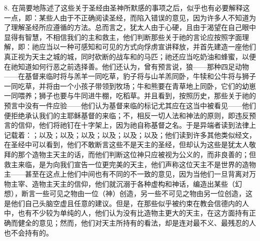 8. 在简要地陈述了这些关于圣经由圣神所默感的事项之后，似乎也有必要解释这一点，即：某些人由于不正确阅读圣经，而陷入错误的意见，因为许多人不知道为了理解圣经所应遵循的方法。总而言之，犹太人由于心硬，且由于渴望在自己眼中显得有智慧，不相信我们的主和救主，他们判断那些关于祂的言论应按照字面理解，即：祂应当以一种可感知和可见的方式向俘虏宣讲释放，并首先建造一座他们真正视为天主之城的城，同时砍断的战车和的马匹；祂还应当吃奶油和蜂蜜，以便在祂知道如何行恶之前选择善。他们还认为，曾有预言说，狼——那种四足动物——在基督来临时将与羔羊一同吃草，豹子将与山羊羔同卧，牛犊和公牛将与狮子一同吃草，并将由一个小孩子带领到牧场；牛和熊要在青草地上同卧，它们的幼崽一同喂养；狮子也要与牛同进牛棚，吃稻草。并且看到，按照历史，那些关于祂的预言中没有一件应验——他们认为基督来临的标记尤其应在这当中被看见——他们便拒绝承认我们的主耶稣基督的来临；不，相反一切人法和神法的原则，即违反预言的信仰，他们将祂钉在十字架上，因为祂自称基督之名。于是异端者读到法律上记载着：；以及；以及；以及；以及；以及；以及；他们读到许多其他类似经文，在圣经中可以看到，他们不敢断言这些不是天主的圣经，但却认为这些是犹太人敬拜的那个造物主天主的话，而他们判断这位神只应被视为公义的，而非良善的；但救主来临，是为向我们宣告一位更完美的天主，他们声称这位天主不是世界的造物主——甚至在这点上他们中间也有不同的不一致的意见，因为当他们一旦背离对万物主宰、造物主天主的信仰，他们就沉溺于各种虚构和神话，编造出某些（幻想），断言一些可见之物由一位（神）创造，另一些不可见之物由另一位创造，这是他们自己头脑空虚且任意的建议。但是，在那些似乎被约束在教会信德内的人中，也有不少较为单纯的人，他们认为没有比造物主更大的天主，在这方面持有正确而健全的意见；然而，他们对天主所持有的看法，却是连对最不义、最残忍的人也不会持有的。\par

